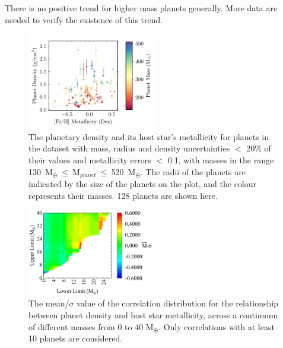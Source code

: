 \documentclass[a4paper,twocolumn,12pt]{article}
\begin{document}
There is no positive trend for higher mass planets generally. More data are needed to verify the existence of this trend.


\begin{figure}[h!]
    \centering
    \includegraphics[width=0.5\textwidth]{Graphs/FeH vs Density Planet Plot Mass 130 to 520.pdf}
    \caption{The planetary density and its host star's metallicity for planets in the dataset with mass, radius and density uncertainties $<$ 20\% of their values and metallicity errors $<$ 0.1, with masses in the range 130~M$_{\oplus}~\leq~$M$_{planet}~\leq~$520~M$_{\oplus}$. The radii of the planets are indicated by the size of the planets on the plot, and the colour represents their masses. 128 planets are shown here.}
    \label{figure: Fe/H vs Density planet plot - Mass range big boi}
\end{figure}


\begin{figure}[h!]
    \centering
    \includegraphics[width=0.49\textwidth]{Graphs/FeH vs Density correlations - Mass ranges - Sub Neptunes.png}
    \caption{The mean/$\sigma$ value of the correlation distribution for the relationship between planet density and host star metallicity, across a continuum of different masses from 0 to 40 M$_{\oplus}$. Only correlations with at least 10 planets are considered.}
    \label{figure: Fe/H vs Density correlations - Mass ranges (0 to 40)}
\end{figure}
\end{document}
